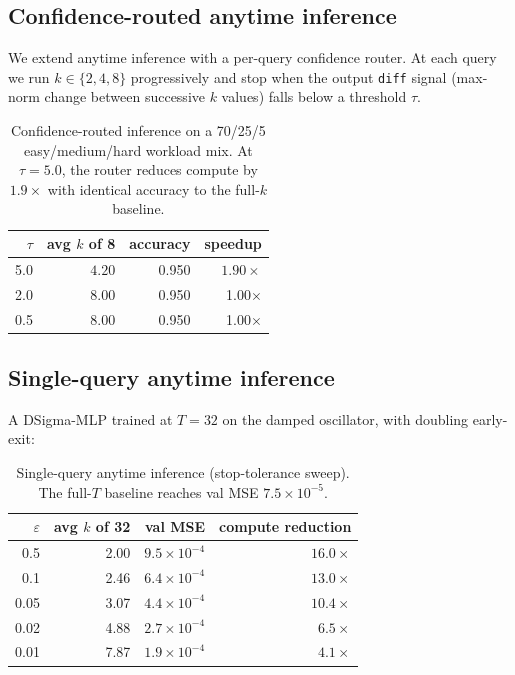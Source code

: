 \documentclass[11pt]{article}
\begin{document}
\subsection{Confidence-routed anytime inference}

We extend anytime inference with a per-query confidence router. At
each query we run $k \in \{2, 4, 8\}$ progressively and stop when the
output \texttt{diff} signal (max-norm change between successive $k$
values) falls below a threshold $\tau$.

\begin{table}[h]
\centering
\begin{tabular}{rrrr}
\toprule
$\tau$ & avg $k$ of 8 & accuracy & speedup \\
\midrule
5.0 & $\mathbf{4.20}$ & 0.950 & $\mathbf{1.90\times}$ \\
2.0 & 8.00 & 0.950 & 1.00$\times$ \\
0.5 & 8.00 & 0.950 & 1.00$\times$ \\
\bottomrule
\end{tabular}
\caption{Confidence-routed inference on a 70/25/5 easy/medium/hard
workload mix. At $\tau=5.0$, the router reduces compute by $1.9\times$
with identical accuracy to the full-$k$ baseline.}
\end{table}

\subsection{Single-query anytime inference}

A DSigma-MLP trained at $T=32$ on the damped oscillator, with
doubling early-exit:

\begin{table}[h]
\centering
\begin{tabular}{rrrr}
\toprule
$\varepsilon$ & avg $k$ of 32 & val MSE & compute reduction \\
\midrule
0.5 & 2.00 & $9.5\times10^{-4}$ & $16.0\times$ \\
0.1 & 2.46 & $6.4\times10^{-4}$ & $13.0\times$ \\
0.05 & 3.07 & $4.4\times10^{-4}$ & $10.4\times$ \\
0.02 & 4.88 & $2.7\times10^{-4}$ & $6.5\times$ \\
0.01 & 7.87 & $1.9\times10^{-4}$ & $4.1\times$ \\
\bottomrule
\end{tabular}
\caption{Single-query anytime inference (stop-tolerance sweep). The
full-$T$ baseline reaches val MSE $7.5\times10^{-5}$.}
\end{table}
\end{document}
